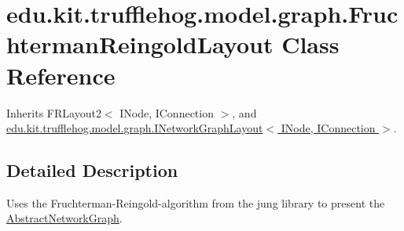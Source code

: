 \hypertarget{classedu_1_1kit_1_1trufflehog_1_1model_1_1graph_1_1_fruchterman_reingold_layout}{}\section{edu.\+kit.\+trufflehog.\+model.\+graph.\+Fruchterman\+Reingold\+Layout Class Reference}
\label{classedu_1_1kit_1_1trufflehog_1_1model_1_1graph_1_1_fruchterman_reingold_layout}


Inherits F\+R\+Layout2$<$ I\+Node, I\+Connection $>$, and \hyperlink{interfaceedu_1_1kit_1_1trufflehog_1_1model_1_1graph_1_1_i_network_graph_layout}{edu.\+kit.\+trufflehog.\+model.\+graph.\+I\+Network\+Graph\+Layout$<$ I\+Node, I\+Connection $>$}.



\subsection{Detailed Description}
Uses the Fruchterman-\/\+Reingold-\/algorithm from the jung library to present the \hyperlink{classedu_1_1kit_1_1trufflehog_1_1model_1_1graph_1_1_abstract_network_graph}{Abstract\+Network\+Graph}. 